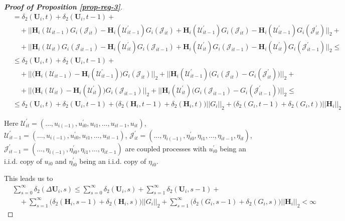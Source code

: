 \documentclass[a4paper,12pt]{article}
\begin{document}
\begin{proof}[\textnormal{\textbf{Proof of Proposition \ref{prop-reg-3}}}]
\begin{align*}
 & = \delta_2(\mathbf{U}_i, t) + \delta_2(\mathbf{U}_i, t-1)  +\\
 &\quad + ||\mathbf{H}_i(\mathcal{U}_{it-1})G_i(\mathcal{J}_{it}) - \mathbf{H}_i(\mathcal{U}_{it-1}^\prime)G_i(\mathcal{J}_{it}) + \mathbf{H}_i(\mathcal{U}_{it-1}^\prime)G_i(\mathcal{J}_{it}) - \mathbf{H}_i(\mathcal{U}_{it-1}^\prime)G_i(\mathcal{J}_{it}^\prime)    ||_2+\\
 &\quad + ||\mathbf{H}_i(\mathcal{U}_{it})G_i(\mathcal{J}_{it-1}) -\mathbf{H}_i(\mathcal{U}_{it}^\prime)G_i(\mathcal{J}_{it-1})+ \mathbf{H}_i(\mathcal{U}_{it}^\prime)G_i(\mathcal{J}_{it-1})-  \mathbf{H}_i(\mathcal{U}_{it}^\prime)G_i(\mathcal{J}_{it-1}^\prime) ||_2 \leq\\
  &\leq \delta_2(\mathbf{U}_i, t) + \delta_2(\mathbf{U}_i, t-1)  + \\
  &\quad +||\big(\mathbf{H}_i(\mathcal{U}_{it-1}) - \mathbf{H}_i(\mathcal{U}_{it-1}^\prime)\big) G_i(\mathcal{J}_{it})||_2 +  ||\mathbf{H}_i(\mathcal{U}_{it-1}^\prime)\big(G_i(\mathcal{J}_{it}) - G_i(\mathcal{J}_{it}^\prime)\big)    ||_2+\\
 &\quad + ||\big(\mathbf{H}_i(\mathcal{U}_{it}) -\mathbf{H}_i(\mathcal{U}_{it}^\prime)\big)G_i(\mathcal{J}_{it-1})||_2 + ||\mathbf{H}_i(\mathcal{U}_{it}^\prime)\big(G_i(\mathcal{J}_{it-1}) -G_i(\mathcal{J}_{it-1}^\prime)\big) ||_2 \leq \\
 &\leq \delta_2(\mathbf{U}_i, t) + \delta_2(\mathbf{U}_i, t-1)  + \big(\delta_2(\mathbf{H}_i, t-1) +  \delta_2(\mathbf{H}_i, t)\big) ||G_i ||_2+ \big( \delta_2(G_i, t-1) +  \delta_2(G_i, t)\big)||\mathbf{H}_i ||_2  
\end{align*}

Here $\mathcal{U}_{it}^\prime  = (\ldots, u_{i(-1)}, u^\prime_{i0}, u_{i1}, \ldots, u_{it-1}, u_{it})$, $\mathcal{U}_{it-1}^\prime  = (\ldots, u_{i(-1)}, u^\prime_{i0}, u_{i1}, \ldots, u_{it-1})$, $\mathcal{J}_{it}^\prime  = (\ldots, \eta_{i(-1)}, \eta^\prime_{i0}, \eta_{i1}, \ldots, \eta_{it-1}, \eta_{it})$, $\mathcal{J}_{it-1}^\prime  = (\ldots, \eta_{i(-1)}, \eta^\prime_{i0}, \eta_{i1}, \ldots, \eta_{it-1})$ are coupled processes with $u_{i0}^\prime$ being an i.i.d. copy of $u_{i0}$ and $\eta_{i0}^\prime$ being an i.i.d. copy of $\eta_{i0}$.

This leads us to 
\begin{align*}
 &\sum_{s=0}^\infty \delta_2(\Delta \mathbf{U}_i, s) \leq \sum_{s=0}^\infty \delta_2(\mathbf{U}_i, s) + \sum_{s=1}^\infty\delta_2(\mathbf{U}_i, s-1)  +\\
 &\quad + \sum_{s=1}^\infty\big(\delta_2(\mathbf{H}_i, s-1) +  \delta_2(\mathbf{H}_i, s)\big) ||G_i ||_2 + \sum_{s=1}^\infty\big( \delta_2(G_i, s-1) +  \delta_2(G_i, s)\big)||\mathbf{H}_i ||_2 <\infty 
\end{align*}


\end{proof}
\end{document}
